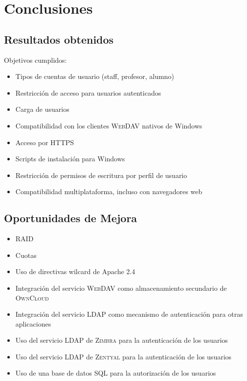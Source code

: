 {
  \linespread{1}
  \cleardoublepage  
  \chapter{Conclusiones}
  \label{chap:cap5}
}

    \section {Resultados obtenidos}

Objetivos cumplidos:

\begin{itemize}
  \item Tipos de cuentas de usuario (staff, profesor, alumno)
  \item Restricci\'{o}n de acceso para usuarios autenticados
  \item Carga de usuarios
  \item Compatibilidad con los clientes \textsc{WebDAV} nativos de Windows
  \item Acceso por \textsc{HTTPS}
  \item Scripts de instalaci\'{o}n para Windows
  \item Restricci\'{o}n de permisos de escritura por perfil de usuario
  \item Compatibilidad multiplataforma, incluso con navegadores web
\end{itemize}

    \section {Oportunidades de Mejora}

\begin{itemize}
  \item \textsc{RAID}
  \item Cuotas
  \item Uso de directivas wilcard de Apache 2.4
  \item Integraci\'{o}n del servicio \textsc{WebDAV} como almacenamiento secundario de \textsc{OwnCloud}
  \item Integraci\'{o}n del servicio \textsc{LDAP} como mecanismo de autenticaci\'{o}n para otras aplicaciones
  \item Uso del servicio \textsc{LDAP} de \textsc{Zimbra} para la autenticaci\'{o}n de los usuarios
  \item Uso del servicio \textsc{LDAP} de \textsc{Zentyal} para la autenticaci\'{o}n de los usuarios
  \item Uso de una base de datos \textsc{SQL} para la autorizaci\'{o}n de los usuarios
\end{itemize}


